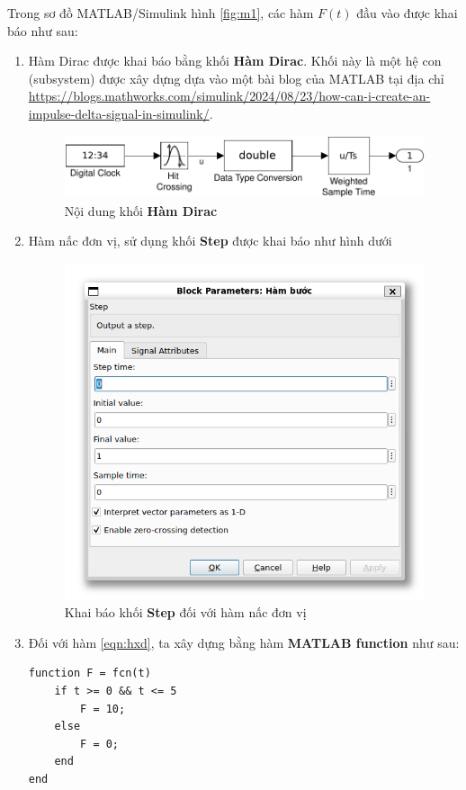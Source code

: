 \documentclass[12pt,a4paper]{article}
\begin{document}
Trong sơ đồ MATLAB/Simulink hình \ref{fig:m1}, các hàm $F(t)$ đầu vào được khai báo như sau:
\begin{enumerate}
    \item Hàm Dirac được khai báo bằng khối \textbf{Hàm Dirac}. Khối này là một hệ con (subsystem) được xây dựng dựa vào một bài blog của MATLAB tại địa chỉ \url{https://blogs.mathworks.com/simulink/2024/08/23/how-can-i-create-an-impulse-delta-signal-in-simulink/}.
    \begin{figure}[ht]
        \centering
        \includegraphics[width=\linewidth]{MATLAB_2.pdf}
        \caption{Nội dung khối \textbf{Hàm Dirac}}
    \end{figure}

    \item Hàm nấc đơn vị, sử dụng khối \textbf{Step} được khai báo như hình dưới
    \vspace{-5mm}
    \begin{figure}[ht]
        \centering
        \includegraphics[width=0.5\linewidth]{MATLAB_3.png}
        \vspace{-5mm}
        \caption{Khai báo khối \textbf{Step} đối với hàm nấc đơn vị}
    \end{figure}

    \item Đối với hàm \eqref{eqn:hxd}, ta xây dựng bằng hàm \textbf{MATLAB function} như sau:
    \begin{lstlisting}[style=matlabstyle,caption=Khai báo hàm \eqref{eqn:hxd}]
function F = fcn(t)
    if t >= 0 && t <= 5
        F = 10;
    else
        F = 0;
    end
end        
    \end{lstlisting}
\end{enumerate}
\end{document}

